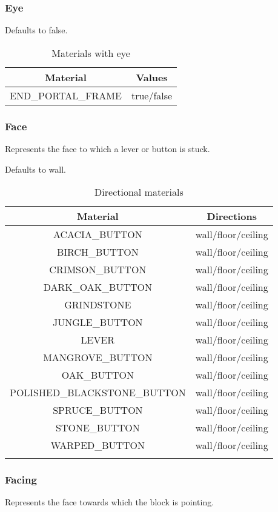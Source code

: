 \subsubsection{Eye}\label{spigot-types:eye}
Defaults to false.

\begin{table}[H]
	\centering
	\begin{tabular}{ |c|c| }
		\hline
		Material & Values \\
		\hline
		END\_PORTAL\_FRAME & true/false \\
		\hline
	\end{tabular}
	\caption{Materials with eye}
\end{table}

\subsubsection{Face}
Represents the face to which a lever or button is stuck.


Defaults to wall.

\begin{longtable}{ |c|c| }
	\hline
	Material & Directions \\
	\hline
	\endhead
	ACACIA\_BUTTON & wall/floor/ceiling \\
	BIRCH\_BUTTON & wall/floor/ceiling \\
	CRIMSON\_BUTTON & wall/floor/ceiling \\
	DARK\_OAK\_BUTTON & wall/floor/ceiling \\
	GRINDSTONE & wall/floor/ceiling \\
	JUNGLE\_BUTTON & wall/floor/ceiling \\
	LEVER & wall/floor/ceiling \\
	MANGROVE\_BUTTON & wall/floor/ceiling \\
	OAK\_BUTTON & wall/floor/ceiling \\
	POLISHED\_BLACKSTONE\_BUTTON & wall/floor/ceiling \\
	SPRUCE\_BUTTON & wall/floor/ceiling \\
	STONE\_BUTTON & wall/floor/ceiling \\
	WARPED\_BUTTON & wall/floor/ceiling \\
	\hline
	\caption{Directional materials}
\end{longtable}

\subsubsection{Facing}
Represents the face towards which the block is pointing.

